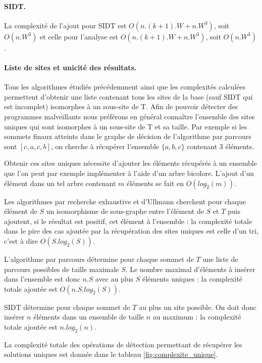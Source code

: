 \paragraph{SIDT.}
La complexité de l'ajout pour SIDT est $O(n.(k+1).W+n.W^3)$, soit $O(n.W^3)$ et celle pour l'analyse est $O(n.(k+1).W+n.W^3)$, soit $O(n.W^3)$.

\paragraph{Liste de sites et unicité des résultats.}
Tous les algorithmes étudiés précédemment ainsi que les complexités calculées permettent d'obtenir une liste contenant tous les sites de la base (sauf SIDT qui est incomplet) isomorphes à un sous-site de T.
Afin de pouvoir détecter des programmes malveillants nous préférons en général connaître l'ensemble des sites uniques qui sont isomorphes à un sous-site de T et sa taille.
Par exemple si les sommets finaux atteints dans le graphe de décision de l'algorithme par parcours sont $[c, a, c, b]$, on cherche à récupérer l'ensemble $\{a, b, c\}$ contenant 3 éléments.

Obtenir ces sites uniques nécessite d'ajouter les éléments récupérés à un ensemble que l'on peut par exemple implémenter à l'aide d'un arbre bicolore. L'ajout d'un élément dans un tel arbre contenant $m$ éléments se fait en $O(log_2(m))$.

Les algorithmes par recherche exhaustive et d'Ullmann cherchent pour chaque élément de $S$ un isomorphisme de sous-graphe entre l'élément de $S$ et $T$ puis ajoutent, si le résultat est positif, cet élément à l'ensemble : la complexité totale dans le pire des cas ajoutée par la récupération des sites uniques est celle d'un tri, c'est à dire $O(S.log_2(S))$.

L'algorithme par parcours détermine pour chaque sommet de $T$ une liste de parcours possibles de taille maximale $S$. Le nombre maximal d'éléments à insérer dans l'ensemble est donc $n.S$ avec au plus $S$ éléments uniques : la complexité totale ajoutée est $O(n.S.log_2(S))$.

SIDT détermine pour chaque sommet de $T$ au plus un site possible. On doit donc insérer $n$ éléments dans un ensemble de taille $n$ au maximum : la complexité totale ajoutée est $n.log_2(n)$.

La complexité totale des opérations de détection permettant de récupérer les solutions uniques est donnée dans le tableau \ref{fig:complexite_unique}.


